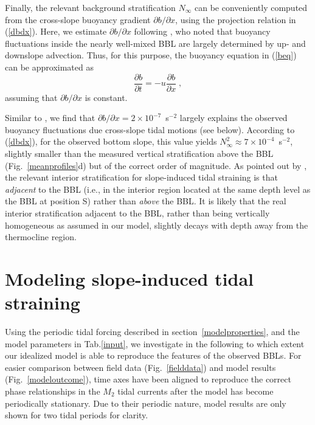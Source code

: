 Finally, the relevant background stratification $N_\infty$ can be
conveniently computed from the cross-slope buoyancy gradient $\partial
b / \partial x$, using the projection relation in (\ref{dbdx}). Here,
we estimate $\partial b / \partial x$ following \cite{Endohetal2016a},
who noted that buoyancy fluctuations inside the nearly well-mixed BBL
are largely determined by up- and downslope advection. Thus, for this
purpose, the buoyancy equation in (\ref{beq}) can be approximated as
\begin{equation}
  \label{badv}
  \frac{\partial b}{\partial t} = -u \frac{\partial b}{\partial x} \; ,
\end{equation}
assuming that $\partial b / \partial x$ is constant.

Similar to \cite{Endohetal2016a}, we find that $\partial b / \partial
x=2 \times 10^{-7}$~s$^{-2}$ largely explains the observed buoyancy
fluctuations due cross-slope tidal motions (see below). According to
(\ref{dbdx}), for the observed bottom slope, this value yields
$N_\infty^2 \approx 7 \times 10^{-4}$~s$^{-2}$, slightly smaller than
the measured vertical stratification above the BBL
(Fig.\ \ref{meanprofiles}d) but of the correct order of magnitude. As
pointed out by \cite{Endohetal2016a}, the relevant interior
stratification for slope-induced tidal straining is that
\emph{adjacent} to the BBL (i.e., in the interior region located at
the same depth level as the BBL at position S) rather than
\emph{above} the BBL. It is likely that the real interior
stratification adjacent to the BBL, rather than being vertically
homogeneous as assumed in our model, slightly decays with depth away
from the thermocline region.

\section{Modeling slope-induced tidal straining} \label{modelresults}

Using the periodic tidal forcing described in
section~\ref{modelproperties}, and the model parameters in
Tab.\ref{input}, we investigate in the following to which extent our
idealized model is able to reproduce the features of the observed
BBLs. For easier comparison between field data (Fig.\ \ref{fielddata})
and model results (Fig.\ \ref{modeloutcome}), time axes have been
aligned to reproduce the correct phase relationships in the $M_2$
tidal currents after the model has become periodically stationary. Due
to their periodic nature, model results are only shown for two tidal
periods for clarity.

